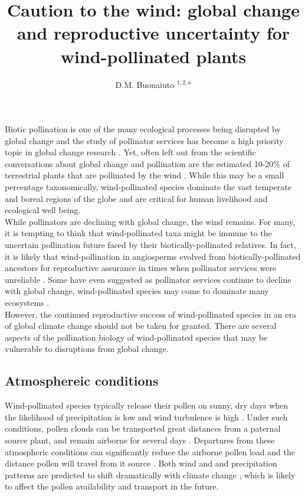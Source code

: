 \documentclass[11pt]{article}
\title{Caution to the wind: global change and reproductive uncertainty for wind-pollinated plants}\\
\date{}
\author{D.M. Buonaiuto $^{1,2,a}$}
\begin{document}
\noindent Biotic pollination is one of the many ecological processes being disrupted by global change \citep{Gerard:2020aa} and the study of pollinator services has become a high priority topic in global change research \citep{Dicks975,Kremen:2000aa}. Yet, often left out from the scientific conversations about global change and pollination are the estimated 10-20\% of terrestrial plants that are pollinated by the wind \citep{Ollerton:2011aa,Friedman:2009aa,Ackerman:2000aa}. While this may be a small percentage taxonomically, wind-pollinated species dominate the vast temperate and boreal regions of the globe \citep{Regal:1982aa} and are critical for human livelihood and ecological well being.\\

\noindent While pollinators are declining with global change, the wind remains. %
For many, it is tempting to think that wind-pollinated taxa might be immune to the uncertain pollination future faced by their biotically-pollinated relatives. In fact, it is likely that wind-pollination in angiosperms evolved from biotically-pollinated ancestors for reproductive assurance in times when pollinator services were unreliable \citep{Friedman:2009aa}. Some have even suggested as pollinator services continue to decline with global change, wind-pollinated species may come to dominate many ecosystems \citep{Bond:1995aa,Hoiss:2013aa}.\\

\noindent However, the continued reproductive success of wind-pollinated species in an era of global climate change should not be taken for granted. There are several aspects of the pollination biology of wind-pollinated species that may be vulnerable to disruptions from global change.  \\

\subsection*{Atmosphereic conditions}
Wind-pollinated species typically release their pollen on sunny, dry days when the likelihood of precipitation is low and wind turbulence is high \citep{}. Under such conditions, pollen clouds can be transported great distances from a paternal source plant, and remain airborne for several days \citep{}. Departures from these atmospheric conditions can significantly reduce the airborne pollen load and the distance pollen will travel from it source \citep{}. Both wind and and precipitation patterns are predicted to shift dramatically with climate change \citep{}, which is likely to affect the pollen availability and transport in the future.\\
\end{document}
